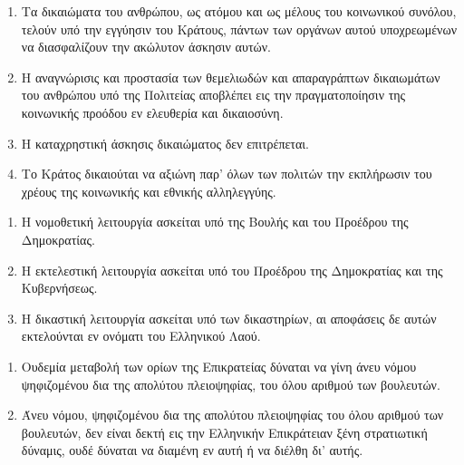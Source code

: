 \documentclass[twoside, a4paper, 10pt]{article}
\begin{document}
\begin{multicols}{2}
\begin{enumerate}
\begin{BigQuote}
\begin{enumerate}
  \item[1.] Τα δικαιώματα του ανθρώπου, ως ατόμου και ως μέλους του κοινωνικού συνόλου, τελούν υπό την εγγύησιν του Κράτους, πάντων των οργάνων αυτού υποχρεωμένων να διασφαλίζουν την ακώλυτον άσκησιν αυτών.
  \item[2.] Η αναγνώρισις και προστασία των θεμελιωδών και απαραγράπτων δικαιωμάτων του ανθρώπου υπό της Πολιτείας αποβλέπει εις την πραγματοποίησιν της κοινωνικής προόδου εν ελευθερία και δικαιοσύνη.
  \item[3.] Η καταχρηστική άσκησις δικαιώματος δεν επιτρέπεται.
  \item[4.] Το Κράτος δικαιούται να αξιώνη παρ' όλων των πολιτών την εκπλήρωσιν του χρέους της κοινωνικής και εθνικής αλληλεγγύης.
\end{enumerate}


\begin{enumerate}
  \item[1.] Η νομοθετική λειτουργία ασκείται υπό της Βουλής και του Προέδρου της Δημοκρατίας.
  \item[2.] Η εκτελεστική λειτουργία ασκείται υπό του Προέδρου της Δημοκρατίας και της Κυβερνήσεως.
  \item[3.] Η δικαστική λειτουργία ασκείται υπό των δικαστηρίων, αι αποφάσεις δε αυτών εκτελούνται εν ονόματι του Ελληνικού Λαού.
\end{enumerate}

\begin{enumerate}
  \item[1.] Ουδεμία μεταβολή των ορίων της Επικρατείας δύναται να γίνη άνευ νόμου ψηφιζομένου δια της απολύτου πλειοψηφίας, του όλου αριθμού των βουλευτών.
  \item[2.] Άνευ νόμου, ψηφιζομένου δια της απολύτου πλειοψηφίας του όλου αριθμού των βουλευτών, δεν είναι δεκτή εις την Ελληνικήν Επικράτειαν ξένη στρατιωτική δύναμις, ουδέ δύναται να διαμένη εν αυτή ή να διέλθη δι' αυτής.
\end{enumerate}


\end{BigQuote}
\end{enumerate}
\end{multicols}
\end{document}
